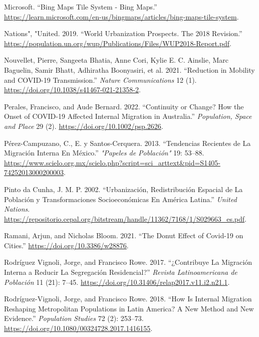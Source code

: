 \documentclass[
  10pt,
  letterpaper,
  DIV=11,
  numbers=noendperiod]{scrartcl}
\newlength{\cslhangindent}
\newlength{\cslentryspacingunit} %
\newenvironment{CSLReferences}[2] %
 {%
  \setlength{\parindent}{0pt}
  \ifodd #1
  \let\oldpar\par
  \def\par{\hangindent=\cslhangindent\oldpar}
  \fi
  \setlength{\parskip}{#2\cslentryspacingunit}
 }%
 {}
\begin{document}
\begin{CSLReferences}{1}{0}
\leavevmode{}%
Microsoft. {``{B}ing {M}aps {T}ile {S}ystem - {B}ing {M}aps.''}
\url{https://learn.microsoft.com/en-us/bingmaps/articles/bing-maps-tile-system}.

\leavevmode{}%
Nations", "United. 2019. {``World Urbanization Prospects. The 2018
Revision.''}
\url{https://population.un.org/wup/Publications/Files/WUP2018-Report.pdf}.

\leavevmode{}%
Nouvellet, Pierre, Sangeeta Bhatia, Anne Cori, Kylie E. C. Ainslie, Marc
Baguelin, Samir Bhatt, Adhiratha Boonyasiri, et al. 2021. {``Reduction
in Mobility and COVID-19 Transmission.''} \emph{Nature Communications}
12 (1). \url{https://doi.org/10.1038/s41467-021-21358-2}.

\leavevmode{}%
Perales, Francisco, and Aude Bernard. 2022. {``Continuity or Change? How
the Onset of COVID{-}19 Affected Internal Migration in Australia.''}
\emph{Population, Space and Place} 29 (2).
\url{https://doi.org/10.1002/psp.2626}.

\leavevmode{}%
Pérez-Campuzano, C., E. y Santos-Cerquera. 2013. {``Tendencias Recientes
de La Migración Interna En México.''} \emph{"Papeles de Población"} 19:
53--88.
\url{https://www.scielo.org.mx/scielo.php?script=sci_arttext\&pid=S1405-74252013000200003}.

\leavevmode{}%
Pinto da Cunha, J. M. P. 2002. {``Urbanización, Redistribución Espacial
de La Población y Transformaciones Socioeconómicas En América Latina.''}
\emph{United Nations}.
\url{https://repositorio.cepal.org/bitstream/handle/11362/7168/1/S029663_es.pdf}.

\leavevmode{}%
Ramani, Arjun, and Nicholas Bloom. 2021. {``The Donut Effect of Covid-19
on Cities.''} \url{https://doi.org/10.3386/w28876}.

\leavevmode{}%
Rodríguez Vignoli, Jorge, and Francisco Rowe. 2017. {``¿Contribuye La
Migración Interna a Reducir La Segregación Residencial?''} \emph{Revista
Latinoamericana de Población} 11 (21): 7--45.
\url{https://doi.org/10.31406/relap2017.v11.i2.n21.1}.

\leavevmode{}%
Rodríguez-Vignoli, Jorge, and Francisco Rowe. 2018. {``How Is Internal
Migration Reshaping Metropolitan Populations in Latin America? A New
Method and New Evidence.''} \emph{Population Studies} 72 (2): 253--73.
\url{https://doi.org/10.1080/00324728.2017.1416155}.


\end{CSLReferences}
\end{document}
